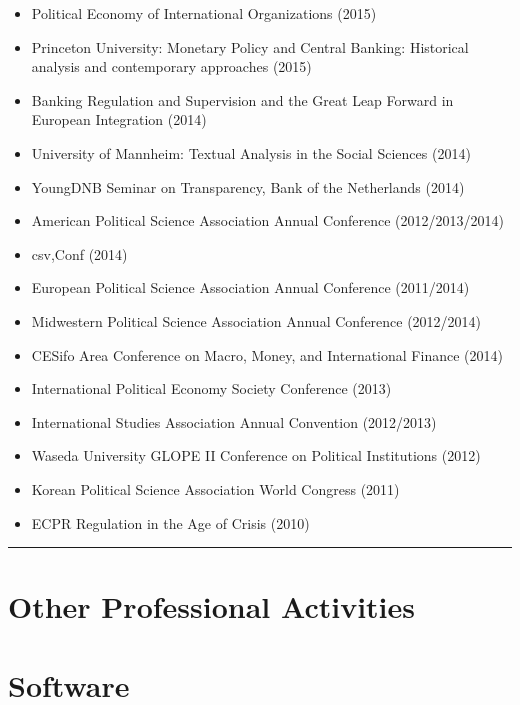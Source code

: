 \documentclass[a4paper]{article}
\begin{document}
{{\begin{itemize}
    \item Political Economy of International Organizations (2015)
    \item Princeton University: Monetary Policy and Central Banking: Historical analysis and contemporary approaches (2015)
    \item Banking Regulation and Supervision and the Great Leap Forward in European Integration (2014)
    \item University of Mannheim: Textual Analysis in the Social Sciences (2014)
    \item YoungDNB Seminar on Transparency, Bank of the Netherlands (2014)
    \item American Political Science Association Annual Conference (2012/2013/2014)
    \item csv,Conf (2014)
    \item European Political Science Association Annual Conference (2011/2014)
    \item Midwestern Political Science Association Annual Conference (2012/2014)
    \item CESifo Area Conference on Macro, Money, and International Finance (2014)
    \item International Political Economy Society Conference (2013)
    \item International Studies Association Annual Convention (2012/2013)
    \item Waseda University GLOPE II Conference on Political Institutions (2012)
    \item Korean Political Science Association World Congress (2011)
    \item ECPR Regulation in the Age of Crisis (2010)
\end{itemize}


\vspace{0.25cm}
\medskip\hrule height 1pt
\vspace{0.5cm}

\section*{Other Professional Activities}

\section*{Software}

}}
\end{document}

